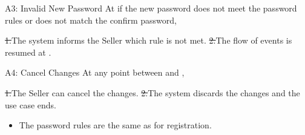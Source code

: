 \begin{flowblock}{A3: Invalid New Password}
At  if the new password does not meet the password rules or does not match the confirm password,\par
\st{1.}{The system informs the Seller which rule is not met.}
\st{2.}{The flow of events is resumed at .}
\end{flowblock}
\begin{flowblock}{A4: Cancel Changes}
At any point between  and ,\par
\st{1.}{The Seller can cancel the changes.}
\st{2.}{The system discards the changes and the use case ends.}
\end{flowblock}
\begin{itemize}
  \item The password rules are the same as for registration.
\end{itemize}

